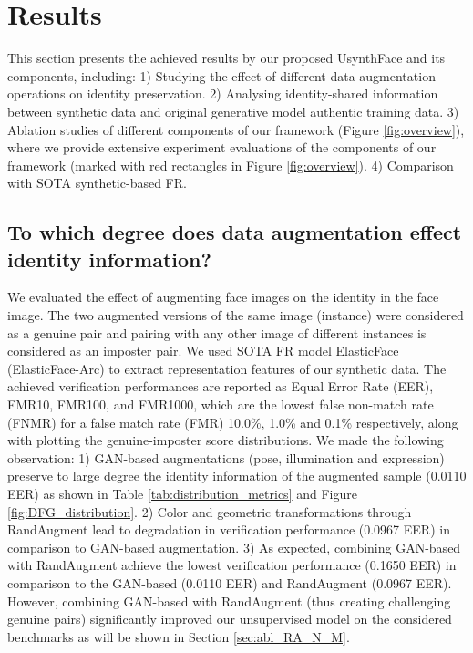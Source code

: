 \documentclass[10pt,twocolumn,letterpaper]{ieeeconf}
\begin{document}
\vspace{-2mm}
\section{Results}
This section presents the achieved results by our proposed UsynthFace and its components, including: 1) Studying the effect of different data augmentation operations on identity preservation. 2) Analysing identity-shared information between synthetic data and original generative model authentic training data. 3) Ablation studies of different components of our framework (Figure \ref{fig:overview}), where we provide extensive experiment evaluations of the components of our framework (marked with red rectangles in Figure \ref{fig:overview}). 4) Comparison with SOTA synthetic-based FR.  

\subsection{To which degree does data augmentation effect identity information?}
We evaluated the effect of augmenting face images on the identity in the face image. The two augmented versions of the same image (instance) were considered as a genuine pair and pairing with any other image of different instances is considered as an imposter pair.  We used SOTA FR model ElasticFace (ElasticFace-Arc) \cite{ElasticFace} to extract representation features of our synthetic data.  The achieved verification performances are reported as Equal Error Rate (EER), FMR10, FMR100, and FMR1000, which are the lowest false non-match rate (FNMR) for a false match rate (FMR) 10.0\%, 1.0\% and 0.1\% respectively, along with plotting the genuine-imposter score distributions.
We made the following observation: 1) GAN-based augmentations (pose, illumination and expression) preserve to large degree the identity information of the augmented sample (0.0110 EER) as shown in Table \ref{tab:distribution_metrics} and Figure \ref{fig:DFG_distribution}. 2) Color and geometric transformations through RandAugment lead to degradation in verification performance (0.0967 EER) in comparison to GAN-based augmentation. 3) As expected, combining GAN-based with RandAugment achieve the lowest verification performance (0.1650 EER) in comparison to the GAN-based (0.0110 EER) and RandAugment (0.0967 EER). However, combining GAN-based with RandAugment (thus creating challenging genuine pairs) significantly improved our unsupervised model on the considered benchmarks as will be shown in Section \ref{sec:abl_RA_N_M}.
\end{document}
